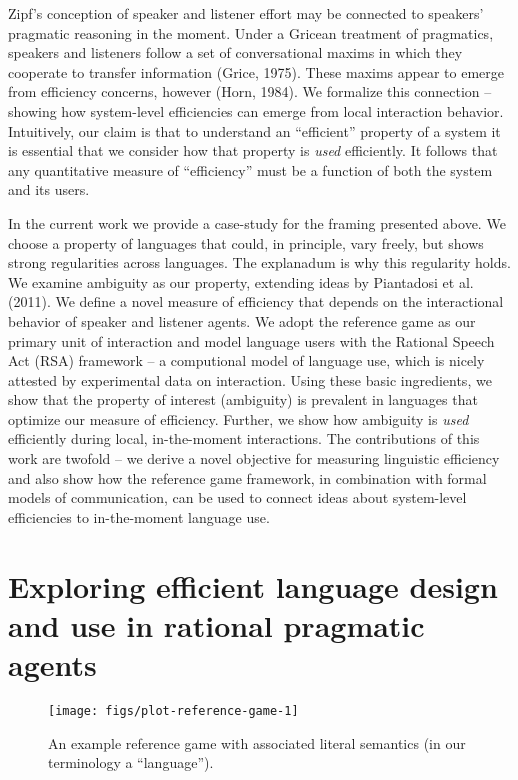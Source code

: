 \documentclass[10pt, letterpaper]{article}
\newenvironment{CodeChunk}{}{}
\begin{document}
Zipf's conception of speaker and listener effort may be connected to
speakers' pragmatic reasoning in the moment. Under a Gricean treatment
of pragmatics, speakers and listeners follow a set of conversational
maxims in which they cooperate to transfer information (Grice, 1975).
These maxims appear to emerge from efficiency concerns, however (Horn,
1984). We formalize this connection -- showing how system-level
efficiencies can emerge from local interaction behavior. Intuitively,
our claim is that to understand an ``efficient'' property of a system it
is essential that we consider how that property is \emph{used}
efficiently. It follows that any quantitative measure of ``efficiency''
must be a function of both the system and its users.\par

In the current work we provide a case-study for the framing presented
above. We choose a property of languages that could, in principle, vary
freely, but shows strong regularities across languages. The explanadum
is why this regularity holds. We examine ambiguity as our property,
extending ideas by Piantadosi et al. (2011). We define a novel measure
of efficiency that depends on the interactional behavior of speaker and
listener agents. We adopt the reference game as our primary unit of
interaction and model language users with the Rational Speech Act (RSA)
framework -- a computional model of language use, which is nicely
attested by experimental data on interaction. Using these basic
ingredients, we show that the property of interest (ambiguity) is
prevalent in languages that optimize our measure of efficiency. Further,
we show how ambiguity is \textit{used} efficiently during local,
in-the-moment interactions. The contributions of this work are twofold
-- we derive a novel objective for measuring linguistic efficiency and
also show how the reference game framework, in combination with formal
models of communication, can be used to connect ideas about system-level
efficiencies to in-the-moment language use.\par

\section{Exploring efficient language design and use in rational
pragmatic
agents}\label{exploring-efficient-language-design-and-use-in-rational-pragmatic-agents}

\begin{CodeChunk}
\begin{figure}[H]

{\centering \texttt{[image: figs/plot-reference-game-1]} 

}

\caption[An example reference game with associated literal semantics (in our terminology a ``language'')]{An example reference game with associated literal semantics (in our terminology a ``language'').}\label{fig:plot-reference-game}
\end{figure}
\end{CodeChunk}
\end{document}
